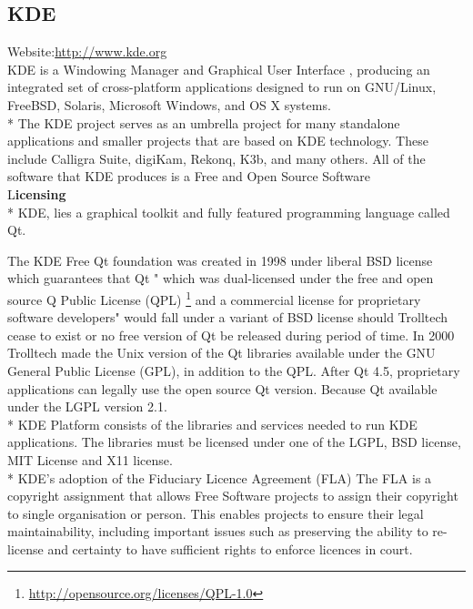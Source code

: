 \documentclass[11pt]{article} %
\begin{document}

\subsection{KDE} %

Website:\url {http://www.kde.org}\\
KDE is a Windowing Manager and Graphical User Interface , producing an integrated set of cross-platform applications designed to run on GNU/Linux, FreeBSD, Solaris, Microsoft Windows, and OS X systems.\\*
The KDE project serves as an umbrella project for many standalone applications and smaller projects that are based on KDE technology. These include Calligra Suite, digiKam, Rekonq, K3b, and many others.
All of the software that KDE produces is a Free and Open Source Software \\

{L\bf icensing} \\*
KDE, lies a graphical toolkit and fully featured programming language called Qt.

The KDE Free Qt foundation was created in 1998 under liberal BSD license which guarantees that Qt " which was dual-licensed under the free and open source Q Public License (QPL) \footnote {\url{http://opensource.org/licenses/QPL-1.0}}  and a commercial license for proprietary software developers" would fall under a variant of BSD license should Trolltech cease to exist or no free version of Qt be released during period of time.
 In 2000 Trolltech made the Unix version of the Qt libraries available under the GNU General Public License (GPL), in addition to the QPL.
After Qt 4.5, proprietary applications can legally use the open source Qt version.
Because Qt available under the LGPL version 2.1.\\*
 KDE Platform consists of the libraries and services needed to run KDE applications. The libraries must be licensed under one of the LGPL, BSD license, MIT License and X11 license.\\*
KDE's adoption of the Fiduciary Licence Agreement (FLA) The FLA is a copyright assignment that allows Free Software projects to assign their copyright to single organisation or person. This enables projects to ensure their legal maintainability, including important issues such as preserving the ability to re-license and certainty to have sufficient rights to enforce licences in court.


\end{document}
